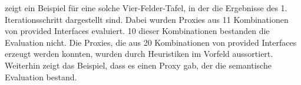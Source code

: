 {} zeigt ein Beispiel für eine solche Vier-Felder-Tafel, in der die Ergebnisse des 1. Iterationsschritt dargestellt sind. Dabei wurden Proxies aus 11 Kombinationen von provided Interfaces evaluiert. 10 dieser Kombinationen bestanden die Evaluation nicht. Die Proxies, die aus 20 Kombinationen von provided Interfaces erzeugt werden konnten, wurden durch Heuristiken im Vorfeld aussortiert. Weiterhin zeigt das Beispiel, dass es einen Proxy gab, der die semantische Evaluation bestand.


